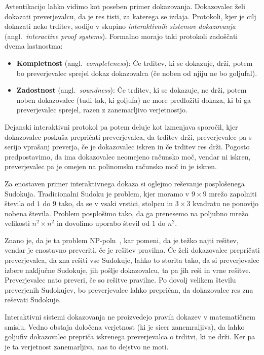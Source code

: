 \documentclass[isrm2, tisk]{fmfdelo}
\begin{document}
Avtentikacijo lahko vidimo kot poseben primer dokazovanja. Dokazovalec želi dokazati preverjevalcu, da
je res tisti, za katerega se izdaja. Protokoli, kjer je cilj dokazati neko trditev, sodijo v skupino
\textit{interaktivnih sistemov dokazovanja} (angl.\ \textit{interactive proof systems}). Formalno
morajo taki protokoli zadoščati dvema lastnostma:
\begin{itemize}
    \item \textbf{Kompletnost} (angl.\ \textit{completeness}): Če trditev, ki se dokazuje,
        drži, potem bo preverjevalec sprejel dokaz dokazovalca (če noben od njiju ne bo goljufal).
    \item \textbf{Zadostnost} (angl.\ \textit{soundness}): Če trditev, ki se dokazuje, ne
        drži, potem noben dokazovalec (tudi tak, ki goljufa) ne more predložiti dokaza, ki bi 
        ga preverjevalec sprejel, razen z zanemarljivo verjetnostjo.
\end{itemize}
Dejanski interaktivni protokol pa potem deluje kot izmenjava sporočil, kjer dokazovalec poskuša
prepričati preverjevalca, da trditev drži, preverjevalec pa s serijo vprašanj preverja, če je
dokazovalec iskren in če trditev res drži. Pogosto predpostavimo, da ima dokazovalec neomejeno
računsko moč, vendar ni iskren, preverjevalec pa je omejen na polinomsko računsko moč in je iskren.

\begin{primer}
    Za enostaven primer interaktivnega dokaza si oglejmo reševanje posplošenega Sudokuja. Tradicionalni
    Sudoku je problem, kjer moramo v $9 \times 9$ mrežo zapolniti števila od $1$ do $9$ tako, da se v vsaki
    vrstici, stolpcu in $3 \times 3$ kvadratu ne ponovijo nobena števila. Problem posplošimo tako, da
    ga prenesemo na poljubno mrežo velikosti $n^2 \times n^2$ in dovolimo uporabo števil od $1$ do $n^2$.

    Znano je, da je ta problem NP-poln~\cite{yato2003sudoku}, kar pomeni, da je težko najti rešitev,
    vendar je enostavno preveriti, če je rešitev pravilna. Če želi dokazovalec prepričati preverjevalca,
    da zna rešiti vse Sudokuje, lahko to storita tako, da si preverjevalec izbere naključne Sudokuje,
    jih pošlje dokazovalcu, ta pa jih reši in vrne rešitve. Preverjevalec nato preveri, če so rešitve pravilne.
    Po dovolj velikem številu preverjenih Sudokujev, bo preverjevalec lahko prepričan, da dokazovalec
    res zna reševati Sudokuje.
\end{primer}

\begin{opomba}
    Interaktivni sistemi dokazovanja ne proizvedejo pravih dokazev v matematičnem smislu. Vedno
    obstaja določena verjetnost (ki je sicer zanemraljiva), da lahko goljufiv dokazovalec prepriča
    iskrenega preverjevalca o trditvi, ki ne drži. Ker pa je ta verjetnost zanemarljiva, nas to
    dejstvo ne moti.
\end{opomba}
\end{document}
